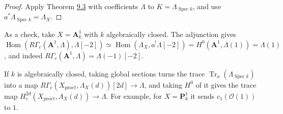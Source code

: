 \documentclass[11pt]{article}
\providecommand{\Hom}{}\renewcommand{\Hom}{\operatorname{Hom}}
\begin{document}
\begin{proof}[{Proof}]\label{bp97}%
Apply Theorem \hyperref[bp9]{9.3} with coefficients \(\Lambda\) to \(K=\Lambda_{\operatorname{Spec}k}\), and use \(a^*\Lambda_{\operatorname{Spec}k}=\Lambda_X\).
\end{proof}

\label{bp98}%
As a check, take \(X=\mathbf A^1_k\) with \(k\) algebraically closed. The adjunction gives \(\Hom(R\Gamma_c(\mathbf A^1,\Lambda),\Lambda[-2])\simeq\Hom(\Lambda_X,a^!\Lambda[-2])
=H^0(\mathbf A^1,\Lambda(1))=\Lambda(1)\), and indeed \(R\Gamma_c(\mathbf A^1,\Lambda)=\Lambda(-1)[-2]\).

If \(k\) is algebraically closed, taking global sections turns the trace \(\operatorname{Tr}_a(\Lambda_{\operatorname{Spec}k})\) into a map \(R\Gamma_c(X_{\mathrm{pro}\acute{e}t},\Lambda_X(d))[2d]\to\Lambda\), and taking \(H^0\) of it gives the trace map \(H_c^{2d}(X_{\mathrm{pro}\acute{e}t},\Lambda_X(d))\to\Lambda\). For example, for \(X=\mathbf P^1_k\) it sends \(c_1(\mathcal O(1))\) to \(1\).



\clearpage{}\hypertarget{bp-outside}{}%
\end{document}
